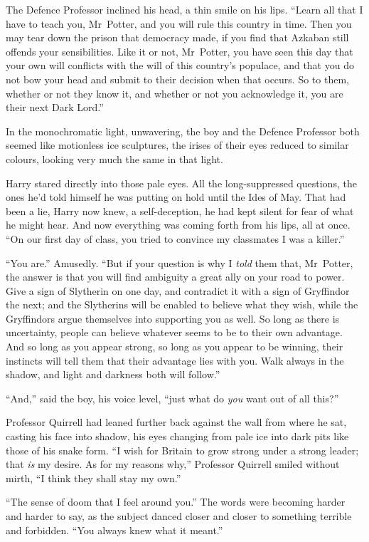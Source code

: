 The Defence Professor inclined his head, a thin smile on his lips. “Learn all that I have to teach you, Mr~Potter, and you will rule this country in time. Then you may tear down the prison that democracy made, if you find that Azkaban still offends your sensibilities. Like it or not, Mr~Potter, you have seen this day that your own will conflicts with the will of this country’s populace, and that you do not bow your head and submit to their decision when that occurs. So to them, whether or not they know it, and whether or not you acknowledge it, you are their next Dark Lord.”

In the monochromatic light, unwavering, the boy and the Defence Professor both seemed like motionless ice sculptures, the irises of their eyes reduced to similar colours, looking very much the same in that light.

Harry stared directly into those pale eyes. All the long-suppressed questions, the ones he’d told himself he was putting on hold until the Ides of May. That had been a lie, Harry now knew, a self-deception, he had kept silent for fear of what he might hear. And now everything was coming forth from his lips, all at once. “On our first day of class, you tried to convince my classmates I was a killer.”

“You are.” Amusedly. “But if your question is why I \emph{told} them that, Mr~Potter, the answer is that you will find ambiguity a great ally on your road to power. Give a sign of Slytherin on one day, and contradict it with a sign of Gryffindor the next; and the Slytherins will be enabled to believe what they wish, while the Gryffindors argue themselves into supporting you as well. So long as there is uncertainty, people can believe whatever seems to be to their own advantage. And so long as you appear strong, so long as you appear to be winning, their instincts will tell them that their advantage lies with you. Walk always in the shadow, and light and darkness both will follow.”

“And,” said the boy, his voice level, “just what do \emph{you} want out of all this?”

Professor Quirrell had leaned further back against the wall from where he sat, casting his face into shadow, his eyes changing from pale ice into dark pits like those of his snake form. “I wish for Britain to grow strong under a strong leader; that \emph{is} my desire. As for my reasons why,” Professor Quirrell smiled without mirth, “I think they shall stay my own.”

“The sense of doom that I feel around you.” The words were becoming harder and harder to say, as the subject danced closer and closer to something terrible and forbidden. “You always knew what it meant.”

